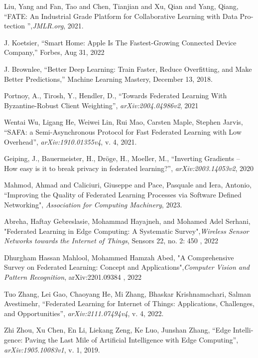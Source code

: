 \begin{thebibliography}{99}
\begin{latin}
Liu, Yang and Fan, Tao and Chen, Tianjian and Xu, Qian and Yang, Qiang, “FATE: An Industrial Grade Platform for Collaborative Learning with Data Protection
”,\textit{JMLR.org}, 2021.

 J. Koetsier, “Smart Home: Apple Is The Fastest-Growing Connected Device Company,” Forbes, Aug 31, 2022

J. Brownlee, “Better Deep Learning: Train Faster, Reduce Overfitting, and Make Better Predictions,” Machine Learning Mastery, December 13, 2018.

 Portnoy, A., Tirosh, Y., Hendler, D., “Towards Federated Learning With Byzantine-Robust Client Weighting”, \textit{arXiv:2004.04986v2}, 2021

Wentai Wu, Ligang He, Weiwei Lin, Rui Mao, Carsten Maple, Stephen Jarvis, “SAFA: a Semi-Asynchronous Protocol for Fast Federated Learning with Low Overhead”,
 \textit{arXiv:1910.01355v4}, v. 4, 2021.

Geiping, J., Bauermeister, H., Dröge, H., Moeller, M., “Inverting Gradients – How easy is it to break privacy in federated learning?”, \textit{arXiv:2003.14053v2}, 2020

Mahmod, Ahmad and Caliciuri, Giuseppe and Pace, Pasquale and Iera, Antonio, ``Improving the Quality of Federated Learning Processes via Software Defined Networking", \textit{Association for Computing Machinery}, 2023.


Abreha, Haftay Gebreslasie, Mohammad Hayajneh, and Mohamed Adel Serhani, "Federated Learning in Edge Computing: A Systematic Survey",\textit{Wireless Sensor Networks towards the Internet of Things}, Sensors 22, no. 2: 450 , 2022

Dhurgham Hassan Mahlool, Mohammed Hamzah Abed, "A Comprehensive Survey on Federated Learning: Concept and Applications",\textit{Computer Vision and Pattern Recognition}, arXiv:2201.09384 , 2022

Tuo Zhang, Lei Gao, Chaoyang He, Mi Zhang, Bhaskar Krishnamachari, Salman Avestimehr, “Federated Learning for Internet of Things: Applications, Challenges, and Opportunities”, \textit{arXiv:2111.07494v4}, v. 4, 2022.

 Zhi Zhou, Xu Chen, En Li, Liekang Zeng, Ke Luo, Junshan Zhang, “Edge Intelligence: Paving the Last Mile of Artificial Intelligence with Edge Computing”, \textit{arXiv:1905.10083v1}, v. 1, 2019.


\end{latin}
\end{thebibliography}
